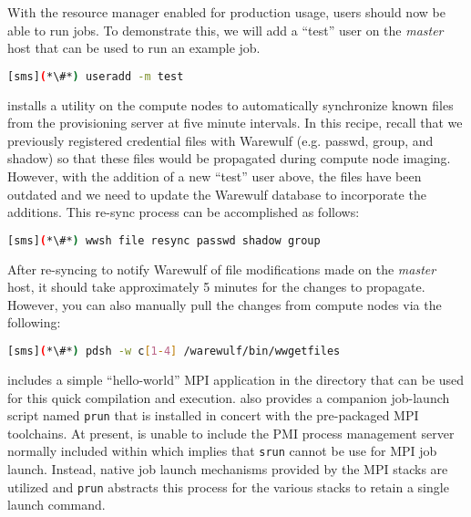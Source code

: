 With the resource manager enabled for production usage, users should now be
able to run jobs. To demonstrate this, we will add a ``test'' user on the {\em master}
host that can be used to run an example job.

\begin{lstlisting}[language=bash,keywords={}]
[sms](*\#*) useradd -m test
\end{lstlisting}

\Warewulf{} installs a utility on the compute nodes to automatically 
synchronize known files from the provisioning server at five minute intervals. In this
recipe, recall that we previously registered credential files with Warewulf (e.g. passwd,
group, and shadow) so that these files would be propagated during compute node
imaging. However, with the addition of a new ``test'' user above, the files
have been outdated and we need to update the Warewulf database to incorporate
the additions. This re-sync process can be accomplished as follows:

\begin{lstlisting}[language=bash,keywords={}]
[sms](*\#*) wwsh file resync passwd shadow group
\end{lstlisting}


\begin{center}
\begin{tcolorbox}[]
\small
After re-syncing to notify Warewulf of file modifications made on the {\em
master} host, it should take approximately 5 minutes for the changes to
propagate. However, you can also manually pull the changes from compute nodes
via the following:
\begin{lstlisting}[language=bash,keywords={}]
[sms](*\#*) pdsh -w c[1-4] /warewulf/bin/wwgetfiles 
\end{lstlisting}
\end{tcolorbox}
\end{center}


\OHPC{} includes a simple ``hello-world'' MPI application in the
 directory that can be used for this quick
compilation and execution. \OHPC{} also provides a companion job-launch script
named \texttt{prun} that is installed in concert with the pre-packaged MPI
toolchains. At present, \OHPC{} is unable to include the PMI process management
server normally included within \SLURM{} which implies that \texttt{srun} cannot
be use for MPI job launch. Instead, native job launch mechanisms provided by
the MPI stacks are utilized and \texttt{prun} abstracts this process for the
various stacks to retain a single launch command.

